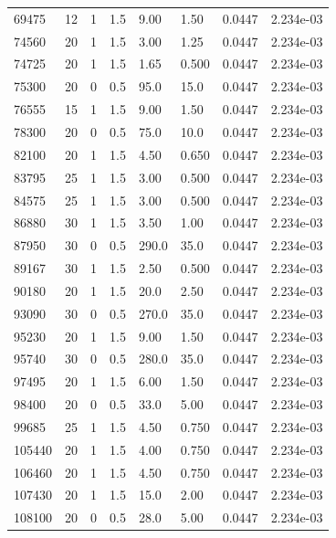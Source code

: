 \documentclass[preview]{standalone}
\begin{document}
{{{\begin{tabular}{L{1.2cm}C{1.2cm} C{0.3cm}C{0.5cm} C{1.4cm}C{1.4cm} C{1.4cm}C{1.4cm}}
  69475  &    12  & 1     & 1.5 &  9.00  & 1.50  & 0.0447 &  2.234e-03   \\ 
  74560  &    20  & 1     & 1.5 &  3.00  & 1.25  & 0.0447 &  2.234e-03   \\ 
  74725  &    20  & 1     & 1.5 &  1.65  & 0.500  & 0.0447 &  2.234e-03   \\ 
  75300  &    20  & 0     & 0.5 &  95.0  & 15.0  & 0.0447 &  2.234e-03   \\ 
  76555  &    15  & 1     & 1.5 &  9.00  & 1.50  & 0.0447 &  2.234e-03   \\ 
  78300  &    20  & 0     & 0.5 &  75.0  & 10.0  & 0.0447 &  2.234e-03   \\ 
  82100  &    20  & 1     & 1.5 &  4.50  & 0.650  & 0.0447 &  2.234e-03   \\ 
  83795  &    25  & 1     & 1.5 &  3.00  & 0.500  & 0.0447 &  2.234e-03   \\ 
  84575  &    25  & 1     & 1.5 &  3.00  & 0.500  & 0.0447 &  2.234e-03   \\ 
  86880  &    30  & 1     & 1.5 &  3.50  & 1.00  & 0.0447 &  2.234e-03   \\ 
  87950  &    30  & 0     & 0.5 &  290.0  & 35.0  & 0.0447 &  2.234e-03   \\ 
  89167  &    30  & 1     & 1.5 &  2.50  & 0.500  & 0.0447 &  2.234e-03   \\ 
  90180  &    20  & 1     & 1.5 &  20.0  & 2.50  & 0.0447 &  2.234e-03   \\ 
  93090  &    30  & 0     & 0.5 &  270.0  & 35.0  & 0.0447 &  2.234e-03   \\ 
  95230  &    20  & 1     & 1.5 &  9.00  & 1.50  & 0.0447 &  2.234e-03   \\ 
  95740  &    30  & 0     & 0.5 &  280.0  & 35.0  & 0.0447 &  2.234e-03   \\ 
  97495  &    20  & 1     & 1.5 &  6.00  & 1.50  & 0.0447 &  2.234e-03   \\ 
  98400  &    20  & 0     & 0.5 &  33.0  & 5.00  & 0.0447 &  2.234e-03   \\ 
  99685  &    25  & 1     & 1.5 &  4.50  & 0.750  & 0.0447 &  2.234e-03   \\ 
  105440  &    20  & 1     & 1.5 &  4.00  & 0.750  & 0.0447 &  2.234e-03   \\ 
  106460  &    20  & 1     & 1.5 &  4.50  & 0.750  & 0.0447 &  2.234e-03   \\ 
  107430  &    20  & 1     & 1.5 &  15.0  & 2.00  & 0.0447 &  2.234e-03   \\ 
  108100  &    20  & 0     & 0.5 &  28.0  & 5.00  & 0.0447 &  2.234e-03   \\ 

\end{tabular}}}}
\end{document}
